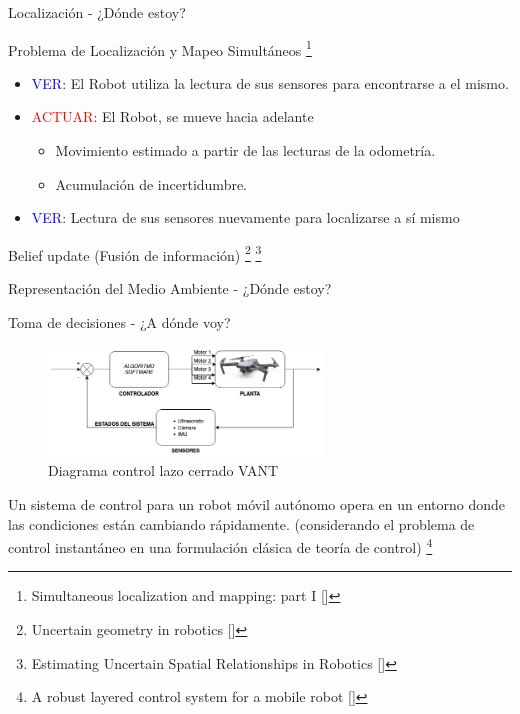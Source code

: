 \documentclass[
  24pt, %
  aspectratio=169, %
]{beamer}
\begin{document}
\begin{frame}{Localización - ¿Dónde estoy?}

  Problema de Localización y Mapeo Simultáneos  \footnote{Simultaneous localization and mapping: part I [\cite{slam_doc}]}
  \bigskip %
  \begin{itemize} 
    \item \textcolor{blue}{VER}: El Robot utiliza la lectura de sus sensores para encontrarse a el mismo.
      \bigskip %
    \item \textcolor{red}{ACTUAR}: El Robot, se mueve hacia adelante
      \begin{itemize}
      \item Movimiento estimado a partir de las lecturas de la odometría.
      \item Acumulación de incertidumbre.
      \end{itemize}
      \bigskip %
    \item \textcolor{blue}{VER}: Lectura de sus sensores nuevamente para localizarse a sí mismo
  \end{itemize}
      
  \bigskip %
  Belief update (Fusión de información) \footnote{Uncertain geometry in robotics [\cite{slam_dur}]} \footnote{Estimating Uncertain Spatial Relationships in Robotics [\cite{Smith1988}]}
  
\end{frame}

\begin{frame}{Representación del Medio Ambiente - ¿Dónde estoy?}

\end{frame}

\begin{frame}{Toma de decisiones - ¿A dónde voy?}
  
  \begin{figure}[h]
    \includegraphics[width=0.65\textwidth]{control_drone.png}
    \caption{Diagrama control lazo cerrado VANT}
  \end{figure}
  \bigskip %
  \small Un sistema de control para un robot móvil autónomo opera en un entorno donde las condiciones están cambiando rápidamente. (considerando el problema de control instantáneo en una formulación clásica de teoría de control) \footnote{A robust layered control system for a mobile robot [\cite{brooks_robot}]}
  
\end{frame}
\end{document}
